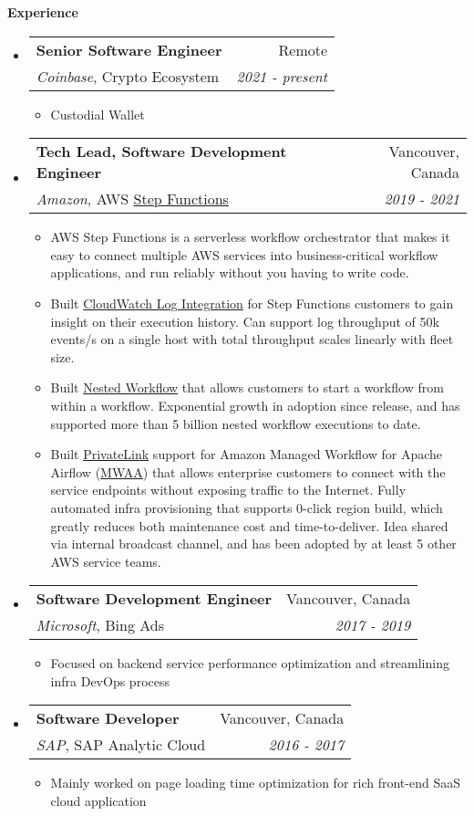 \documentclass[letterpaper,10pt]{article}
\makeatletter
\newcommand{\resitem}[1]{\item #1 \vspace{-2pt}}
\newcommand{\resheading}[1]{{\large \colorbox{mygrey}{\begin{minipage}{\textwidth}{\textbf{#1 \vphantom{p\^{E}}}}\end{minipage}}}}
\newcommand{\ressubheading}[4]{
\begin{tabular*}{7.0in}{l@{\extracolsep{\fill}}r}
    \textbf{#1} & #2 \\
    #3 & \textit{#4} \\
\end{tabular*}\vspace{-6pt}}
\makeatother
\begin{document}
\resheading{Experience}
\begin{itemize}
\itemsep0em
\item
    \ressubheading{Senior Software Engineer}{Remote}{\textit{Coinbase}, Crypto Ecosystem}{2021 - present}
    \begin{itemize}
        \resitem{Custodial Wallet}
	\end{itemize}
\item
    \ressubheading{Tech Lead, Software Development Engineer}{Vancouver, Canada}{\textit{Amazon}, AWS \href{https://aws.amazon.com/step-functions/}{Step Functions}}{2019 - 2021}
    \begin{itemize}
        \resitem{AWS Step Functions is a serverless workflow orchestrator that makes it easy to connect multiple AWS services into business-critical workflow applications, and run reliably without you having to write code. }
        \resitem{Built \href{https://docs.aws.amazon.com/step-functions/latest/dg/cw-logs.html}{CloudWatch Log Integration} for Step Functions customers to gain insight on their execution history. Can support log throughput of 50k events/s on a single host with total throughput scales linearly with fleet size. }
        \resitem{Built \href{https://aws.amazon.com/about-aws/whats-new/2019/08/aws-step-function-adds-support-for-nested-workflows/}{Nested Workflow} that allows customers to start a workflow from within a workflow. Exponential growth in adoption since release, and has supported more than 5 billion nested workflow executions to date. }
        \resitem{Built \href{https://aws.amazon.com/privatelink/}{PrivateLink} support for Amazon Managed Workflow for Apache Airflow (\href{https://docs.aws.amazon.com/mwaa/index.html}{MWAA}) that allows enterprise customers to connect with the service endpoints without exposing traffic to the Internet. Fully automated infra provisioning that supports 0-click region build, which greatly reduces both maintenance cost and time-to-deliver. Idea shared via internal broadcast channel, and has been adopted by at least 5 other AWS service teams. }
	\end{itemize}
\item
    \ressubheading{Software Development Engineer}{Vancouver, Canada}{\textit{Microsoft}, Bing Ads}{2017 - 2019}
    \begin{itemize}
        \resitem{Focused on backend service performance optimization and streamlining infra DevOps process}
	\end{itemize}
\item
    \ressubheading{Software Developer}{Vancouver, Canada}{\textit{SAP}, SAP Analytic Cloud}{2016 - 2017}
    \begin{itemize}
        \resitem{Mainly worked on page loading time optimization for rich front-end SaaS cloud application}
    \end{itemize}
\end{itemize}
\end{document}

